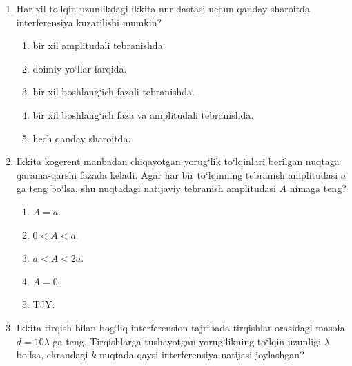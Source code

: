 \begin{enumerate}
\item Har xil to‘lqin uzunlikdagi ikkita nur dastasi uchun qanday sharoitda interferensiya kuzatilishi mumkin?
\begin{enumerate}[label=\Alph*)]
\item bir xil amplitudali tebranishda.
\item doimiy yo‘llar farqida.
\item bir xil boshlang‘ich fazali tebranishda.
\item bir xil boshlang‘ich faza va amplitudali tebranishda.
\item hech qanday sharoitda.
\end{enumerate}

\item Ikkita kogerent manbadan chiqayotgan yorug‘lik to‘lqinlari berilgan nuqtaga qarama-qarshi fazada keladi. Agar har bir to‘lqinning tebranish amplitudasi $a$ ga teng bo‘lsa, shu nuqtadagi natijaviy tebranish amplitudasi $A$ nimaga teng?
\begin{enumerate}[label=\Alph*)]
\item $A=a$.
\item $0<A<a$.
\item $a<A<2a$.
\item $A=0$.
\item TJY.
\end{enumerate}

\item Ikkita tirqish bilan bog‘liq interferension tajribada tirqishlar orasidagi masofa $d=10\lambda$ ga teng. Tirqishlarga tushayotgan yorug‘likning to‘lqin uzunligi $\lambda$ bo‘lsa, ekrandagi $k$ nuqtada qaysi interferensiya natijasi joylashgan?



\end{enumerate}
